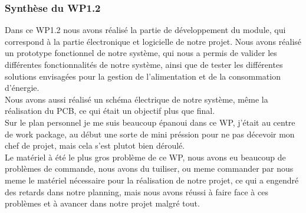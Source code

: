\subsubsection{Synthèse du WP1.2}

Dans ce WP1.2 nous avons réalisé la partie de développement du module, qui correspond à la partie électronique et logicielle 
de notre projet. Nous avons réalisé un prototype fonctionnel de notre système, qui nous a permis de valider les différentes 
fonctionnalités de notre système, ainsi que de tester les différentes solutions envisagées pour la gestion de l'alimentation 
et de la consommation d'énergie.
\\

Nous avons aussi réalisé un schéma électrique de notre système, même la réalisation du PCB, ce qui était un objectif plus que final.
\\

Sur le plan personnel je me suis beaucoup épanoui dans ce WP, j'était au centre de work package, au début une sorte de mini préssion
pour ne pas décevoir mon chef de projet, mais cela s'est plutot bien déroulé.
\\

Le matériel à été le plus gros problème de ce WP, nous avons eu beaucoup de problèmes de commande, nous avons du tuiliser, ou meme commander 
par nous meme le matériel nécessaire pour la réalisation de notre projet, ce qui a engendré des retards dans notre planning,
mais nous avons réussi à faire face à ces problèmes et à avancer dans notre projet malgré tout.
\\

